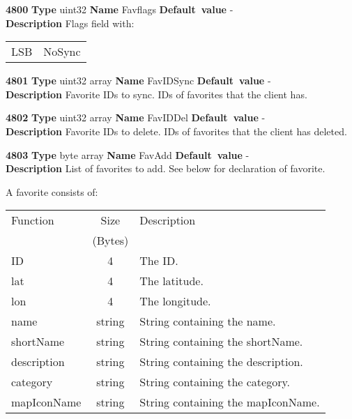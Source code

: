 \documentclass[a4paper]{article}
\begin{document}
\begin{list}{\textbf{ParamID}}{}
\item \textbf{4800} \textbf{Type} uint32 \textbf{Name} Favflags
                 \textbf{Default~value} - \\
  \label{Favflags}
  \textbf{Description} Flags field with:\\
  \begin{tabular}{ll}
    LSB & NoSync                         \\
  \end{tabular}
\item \textbf{4801} \textbf{Type} uint32 array \textbf{Name} FavIDSync
                 \textbf{Default~value} - \\
  \label{FavIDSync}
  \textbf{Description} Favorite IDs to sync. IDs of favorites that the client 
  has.
\item \textbf{4802} \textbf{Type} uint32 array \textbf{Name} FavIDDel
                 \textbf{Default~value} - \\
  \label{FavIDDel}
  \textbf{Description} Favorite IDs to delete. IDs of favorites that the client
  has deleted.
\item \textbf{4803} \textbf{Type} byte array \textbf{Name} FavAdd
                 \textbf{Default~value} - \\
  \label{FavAdd}
  \textbf{Description} List of favorites to add. See below for declaration of
  favorite.
\end{list}


\label{FavoriteData}
A favorite consists of:\\
\begin{centering}
\begin{tabular}{|l|c|p{7cm}|}
\hline
Function    & Size    & Description                 \\
            & (Bytes) &                              \\\hline
ID          & 4       & The ID.                       \\\hline
lat         & 4       & The latitude.                  \\\hline
lon         & 4       & The longitude.                  \\\hline
name        & string  & String containing the name.      \\\hline
shortName   & string  & String containing the shortName.  \\\hline
description & string  & String containing the description. \\\hline
category    & string  & String containing the category.     \\\hline
mapIconName & string  & String containing the mapIconName.   \\\hline
\end{tabular}
\end{centering}
\end{document}
